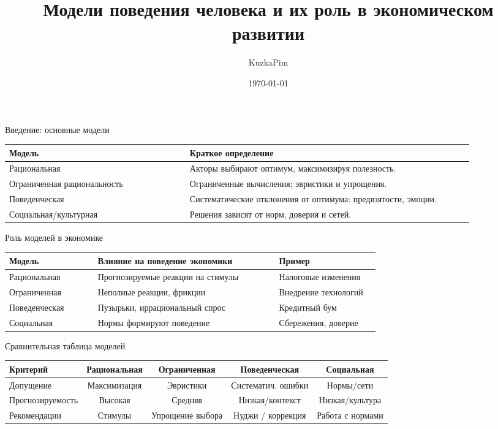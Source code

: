 \documentclass[aspectratio=169]{beamer}
\title[Модели поведения и развитие]{Модели поведения человека и их роль в экономическом развитии}
\author{KuzkaPim}
\institute{Лекция для студентов бакалавриата}
\date{\today}
\begin{document}
\begin{frame}
  \titlepage
\end{frame}

\begin{frame}{Введение: основные модели}
\centering
\begin{tabular}{p{0.35\linewidth} p{0.55\linewidth}}
\toprule
Модель & Краткое определение \\
\midrule
Рациональная & Акторы выбирают оптимум, максимизируя полезность. \\
Ограниченная рациональность & Ограниченные вычисления; эвристики и упрощения. \\
Поведенческая & Систематические отклонения от оптимума: предвзятости, эмоции. \\
Социальная/культурная & Решения зависят от норм, доверия и сетей. \\
\bottomrule
\end{tabular}
\end{frame}

\begin{frame}{Роль моделей в экономике}
\centering
\begin{tabular}{p{0.22\linewidth} p{0.45\linewidth} p{0.25\linewidth}}
\toprule
Модель & Влияние на поведение экономики & Пример \\
\midrule
Рациональная & Прогнозируемые реакции на стимулы & Налоговые изменения \\
Ограниченная & Неполные реакции, фрикции & Внедрение технологий \\
Поведенческая & Пузырьки, иррациональный спрос & Кредитный бум \\
Социальная & Нормы формируют поведение & Сбережения, доверие \\
\bottomrule
\end{tabular}
\end{frame}

\begin{frame}{Сравнительная таблица моделей}
\centering
\begin{tabular}{l c c c c}
\toprule
Критерий & Рациональная & Ограниченная & Поведенческая & Социальная \\
\midrule
Допущение & Максимизация & Эвристики & Систематич. ошибки & Нормы/сети \\
Прогнозируемость & Высокая & Средняя & Низкая/контекст & Низкая/культура \\
Рекомендации & Стимулы & Упрощение выбора & Нуджи / коррекция & Работа с нормами \\
\bottomrule
\end{tabular}
\end{frame}
\end{document}
